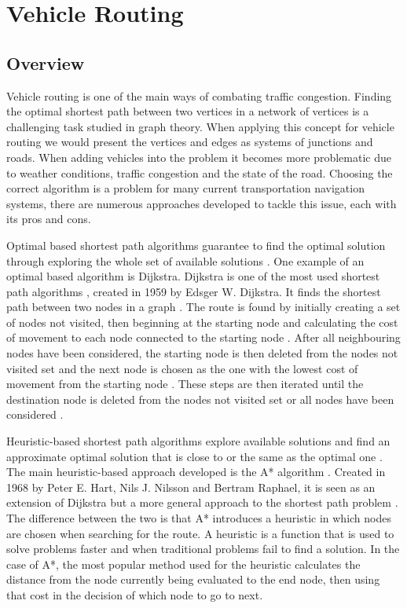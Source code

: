\documentclass[11pt]{report}
\begin{document}
\section{Vehicle Routing}

\subsection{Overview}

Vehicle routing is one of the main ways of combating traffic congestion. Finding the optimal shortest path between two vertices in a network of vertices is a challenging task studied in graph theory. When applying this concept for vehicle routing we would present the vertices and edges as systems of junctions and roads. When adding vehicles into the problem it becomes more problematic due to weather conditions, traffic congestion and the state of the road. Choosing the correct algorithm is a problem for many current transportation navigation systems, there are numerous approaches developed to tackle this issue, each with its pros and cons.

Optimal based shortest path algorithms guarantee to find the optimal solution through exploring the whole set of available solutions \autocite{nha2012comparative}. One example of an optimal based algorithm is Dijkstra. Dijkstra is one of the most used shortest path algorithms \autocite{broumi2016applying}, created in 1959 by Edsger W. Dijkstra. It finds the shortest path between two nodes in a graph \autocite{dijkstra1959note}. The route is found by initially creating a set of nodes not visited, then beginning at the starting node and calculating the cost of movement to each node connected to the starting node \autocite{pathComparison2012}. After all neighbouring nodes have been considered, the starting node is then deleted from the nodes not visited set and the next node is chosen as the one with the lowest cost of movement from the starting node \autocite{pathComparison2012}. These steps are then iterated until the destination node is deleted from the nodes not visited set or all nodes have been considered \autocite{pathComparison2012}.

Heuristic-based shortest path algorithms explore available solutions and find an approximate optimal solution that is close to or the same as the optimal one \autocite{nha2012comparative}. The main heuristic-based approach developed is the A* algorithm \autocite{hartAStar}. Created in 1968 by Peter E. Hart, Nils J. Nilsson and Bertram Raphael, it is seen as an extension of Dijkstra but a more general approach to the shortest path problem \autocite{pathComparison2012}. The difference between the two is that A* introduces a heuristic in which nodes are chosen when searching for the route. A heuristic is a function that is used to solve problems faster and when traditional problems fail to find a solution. In the case of A*, the most popular method used for the heuristic calculates the distance from the node currently being evaluated to the end node, then using that cost in the decision of which node to go to next.
\end{document}

